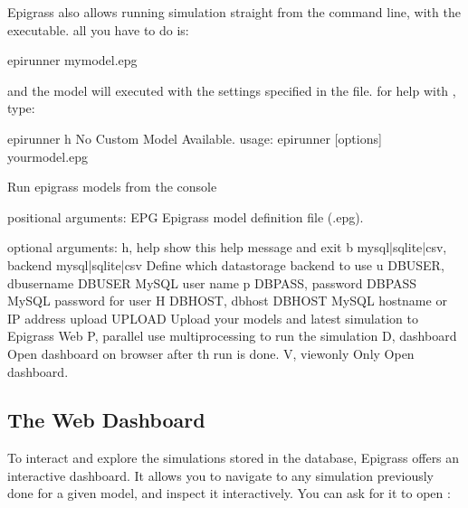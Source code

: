 \documentclass[letterpaper,10pt,english]{sphinxmanual}
\begin{document}
Epigrass also allows running simulation straight from the command line, with the  executable. all you have to do is:

\begin{sphinxVerbatim}[commandchars=\\\{\}]
\PYGZdl{} epirunner mymodel.epg
\end{sphinxVerbatim}

and the model will executed with the settings specified in the  file. for help with , type:

\begin{sphinxVerbatim}[commandchars=\\\{\}]
    \PYGZdl{} epirunner \PYGZhy{}h
    No Custom Model Available.
usage: epirunner [options] your\PYGZus{}model.epg

Run epigrass models from the console

positional arguments:
  EPG                   Epigrass model definition file (.epg).

optional arguments:
  \PYGZhy{}h, \PYGZhy{}\PYGZhy{}help            show this help message and exit
  \PYGZhy{}b \PYGZlt{}mysql|sqlite|csv\PYGZgt{}, \PYGZhy{}\PYGZhy{}backend \PYGZlt{}mysql|sqlite|csv\PYGZgt{}
                        Define which datastorage backend to use
  \PYGZhy{}u DBUSER, \PYGZhy{}\PYGZhy{}dbusername DBUSER
                        MySQL user name
  \PYGZhy{}p DBPASS, \PYGZhy{}\PYGZhy{}password DBPASS
                        MySQL password for user
  \PYGZhy{}H DBHOST, \PYGZhy{}\PYGZhy{}dbhost DBHOST
                        MySQL hostname or IP address
  \PYGZhy{}\PYGZhy{}upload UPLOAD       Upload your models and latest simulation to Epigrass Web
  \PYGZhy{}P, \PYGZhy{}\PYGZhy{}parallel        use multiprocessing to run the simulation
  \PYGZhy{}D, \PYGZhy{}\PYGZhy{}dashboard       Open dashboard on browser after th run is done.
  \PYGZhy{}V, \PYGZhy{}\PYGZhy{}view\PYGZhy{}only       Only Open dashboard.
\end{sphinxVerbatim}


\subsection{The Web Dashboard}
\label{\detokenize{using:the-web-dashboard}}
To interact and explore the simulations stored in the database, Epigrass offers an interactive dashboard. It allows you to
navigate to any simulation previously done for a given model, and inspect it interactively.
You can ask for it to open :
\end{document}
